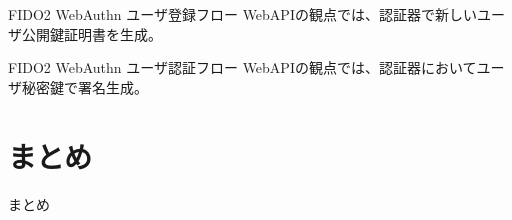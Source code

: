 \documentclass[12pt,dvipdfmx,uplatex]{beamer}
\begin{document}
\begin{frame}{FIDO2 WebAuthn ユーザ登録フロー}
WebAPIの観点では、認証器で新しいユーザ公開鍵証明書を生成。
\end{frame}

\begin{frame}{FIDO2 WebAuthn ユーザ認証フロー}
WebAPIの観点では、認証器においてユーザ秘密鍵で署名生成。
\end{frame}

\section{まとめ}
\begin{frame}
\centering
{\huge まとめ}
\end{frame}

\begin{frame}
 
\end{frame}





 

\end{document}
